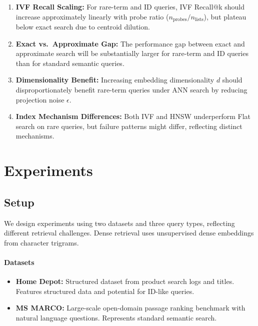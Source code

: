 \documentclass[conference,anonymous]{IEEEtran}
\begin{document}
\begin{enumerate}
\item \textbf{IVF Recall Scaling:} For rare-term and ID queries, IVF Recall@k should increase approximately linearly with probe ratio ($n_{\text{probes}}/n_{\text{lists}}$), but plateau below exact search due to centroid dilution.

\item \textbf{Exact vs.\ Approximate Gap:} The performance gap between exact and approximate search will be substantially larger for rare-term and ID queries than for standard semantic queries.

\item \textbf{Dimensionality Benefit:} Increasing embedding dimensionality $d$ should disproportionately benefit rare-term queries under ANN search by reducing projection noise $\epsilon$.

\item \textbf{Index Mechanism Differences:} Both IVF and HNSW underperform Flat search on rare queries, but failure patterns might differ, reflecting distinct mechanisms.
\end{enumerate}

\section{Experiments}\label{sec:experiments}

\subsection{Setup}

We design experiments using two datasets and three query types, reflecting different retrieval challenges. Dense retrieval uses unsupervised dense embeddings from character trigrams.

\paragraph{Datasets}
\begin{itemize}
\item \textbf{Home Depot:} Structured dataset from product search logs and titles. Features structured data and potential for ID-like queries.

\item \textbf{MS MARCO:} Large-scale open-domain passage ranking benchmark with natural language questions. Represents standard semantic search.
\end{itemize}
\end{document}
